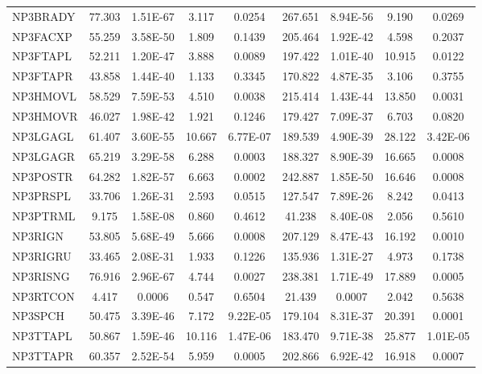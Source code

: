 \documentclass{article}
\begin{document}
\begin{table}[ht!]
{\begin{tabular}{lcccccccc}
        NP3BRADY & 77.303 & 1.51E-67 & 3.117 & 0.0254 & 267.651 & 8.94E-56 & 9.190 & 0.0269 \\ 
        NP3FACXP & 55.259 & 3.58E-50 & 1.809 & 0.1439 & 205.464 & 1.92E-42 & 4.598 & 0.2037 \\ 
        NP3FTAPL & 52.211 & 1.20E-47 & 3.888 & 0.0089 & 197.422 & 1.01E-40 & 10.915 & 0.0122 \\ 
        NP3FTAPR & 43.858 & 1.44E-40 & 1.133 & 0.3345 & 170.822 & 4.87E-35 & 3.106 & 0.3755 \\ 
        NP3HMOVL & 58.529 & 7.59E-53 & 4.510 & 0.0038 & 215.414 & 1.43E-44 & 13.850 & 0.0031 \\ 
        NP3HMOVR & 46.027 & 1.98E-42 & 1.921 & 0.1246 & 179.427 & 7.09E-37 & 6.703 & 0.0820 \\ 
        NP3LGAGL & 61.407 & 3.60E-55 & 10.667 & 6.77E-07 & 189.539 & 4.90E-39 & 28.122 & 3.42E-06 \\ 
        NP3LGAGR & 65.219 & 3.29E-58 & 6.288 & 0.0003 & 188.327 & 8.90E-39 & 16.665 & 0.0008 \\ 
        NP3POSTR & 64.282 & 1.82E-57 & 6.663 & 0.0002 & 242.887 & 1.85E-50 & 16.646 & 0.0008 \\ 
        NP3PRSPL & 33.706 & 1.26E-31 & 2.593 & 0.0515 & 127.547 & 7.89E-26 & 8.242 & 0.0413 \\ 
        NP3PTRML & 9.175 & 1.58E-08 & 0.860 & 0.4612 & 41.238 & 8.40E-08 & 2.056 & 0.5610 \\ 
        NP3RIGN & 53.805 & 5.68E-49 & 5.666 & 0.0008 & 207.129 & 8.47E-43 & 16.192 & 0.0010 \\ 
        NP3RIGRU & 33.465 & 2.08E-31 & 1.933 & 0.1226 & 135.936 & 1.31E-27 & 4.973 & 0.1738 \\ 
        NP3RISNG & 76.916 & 2.96E-67 & 4.744 & 0.0027 & 238.381 & 1.71E-49 & 17.889 & 0.0005 \\ 
        NP3RTCON & 4.417 & 0.0006 & 0.547 & 0.6504 & 21.439 & 0.0007 & 2.042 & 0.5638 \\ 
        NP3SPCH & 50.475 & 3.39E-46 & 7.172 & 9.22E-05 & 179.104 & 8.31E-37 & 20.391 & 0.0001 \\ 
        NP3TTAPL & 50.867 & 1.59E-46 & 10.116 & 1.47E-06 & 183.470 & 9.71E-38 & 25.877 & 1.01E-05 \\ 
        NP3TTAPR & 60.357 & 2.52E-54 & 5.959 & 0.0005 & 202.866 & 6.92E-42 & 16.918 & 0.0007 \\ \hline
    \end{tabular}%
    }
\end{table}
\end{document}
